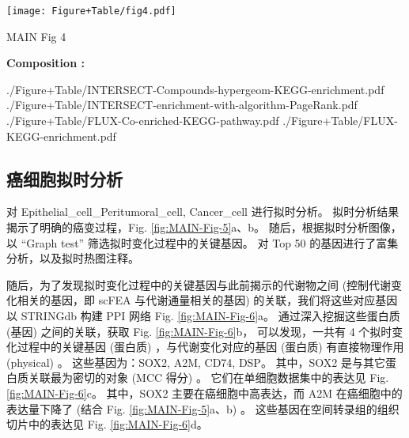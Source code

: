 \documentclass[
]{article}
\begin{document}
\def\@captype{figure}
\begin{center}
\texttt{[image: Figure+Table/fig4.pdf]}
\caption{MAIN Fig 4}\label{fig:MAIN-Fig-4}
\end{center}
\begin{center}\begin{tcolorbox}[colback=gray!10, colframe=gray!50, width=0.9\linewidth, arc=1mm, boxrule=0.5pt]
\textbf{
Composition
:}

\vspace{0.5em}

    ./Figure+Table/INTERSECT-Compounds-hypergeom-KEGG-enrichment.pdf
\newline
./Figure+Table/INTERSECT-enrichment-with-algorithm-PageRank.pdf
\newline ./Figure+Table/FLUX-Co-enriched-KEGG-pathway.pdf
\newline ./Figure+Table/FLUX-KEGG-enrichment.pdf

\vspace{2em}
\end{tcolorbox}
\end{center}

\begin{center}\vspace{1.5cm}\end{center}

\hypertarget{ux764cux7ec6ux80deux62dfux65f6ux5206ux6790}{%
\subsection{癌细胞拟时分析}\label{ux764cux7ec6ux80deux62dfux65f6ux5206ux6790}}

对 Epithelial\_cell\_Peritumoral\_cell, Cancer\_cell 进行拟时分析。
拟时分析结果揭示了明确的癌变过程，Fig. \ref{fig:MAIN-Fig-5}a、b。
随后，根据拟时分析图像，以 ``Graph test'' 筛选拟时变化过程中的关键基因。
对 Top 50 的基因进行了富集分析，以及拟时热图注释。

随后，为了发现拟时变化过程中的关键基因与此前揭示的代谢物之间 (控制代谢变化相关的基因，即 scFEA 与代谢通量相关的基因)
的关联，我们将这些对应基因以 STRINGdb 构建 PPI 网络 Fig. \ref{fig:MAIN-Fig-6}a。
通过深入挖掘这些蛋白质 (基因) 之间的关联，获取 Fig. \ref{fig:MAIN-Fig-6}b，
可以发现，一共有 4 个拟时变化过程中的关键基因 (蛋白质) ，与代谢变化对应的基因 (蛋白质) 有直接物理作用 (physical) 。
这些基因为：SOX2, A2M, CD74, DSP。
其中，SOX2 是与其它蛋白质关联最为密切的对象 (MCC 得分) 。
它们在单细胞数据集中的表达见 Fig. \ref{fig:MAIN-Fig-6}c。
其中，SOX2 主要在癌细胞中高表达，而 A2M 在癌细胞中的表达量下降了 (结合 Fig. \ref{fig:MAIN-Fig-5}a、b) 。
这些基因在空间转录组的组织切片中的表达见 Fig. \ref{fig:MAIN-Fig-6}d。
\end{document}
